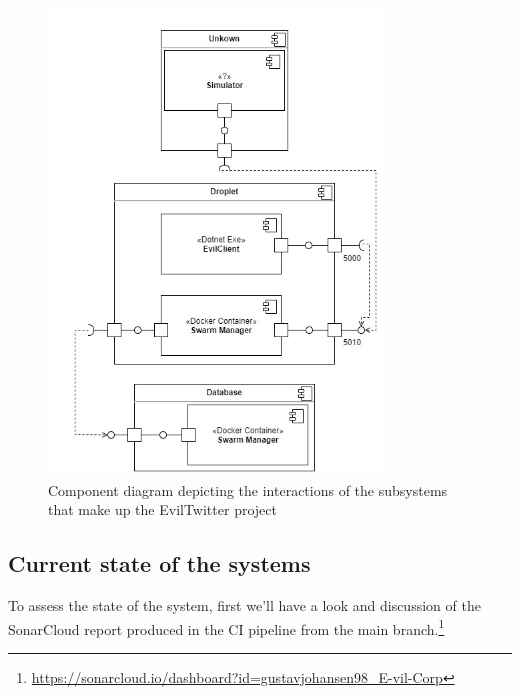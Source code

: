 \documentclass[report/main.tex]{subfiles}
\begin{document}
        \begin{figure}[H]
            \centering
            \includegraphics[width=0.8\textwidth]{report/images/EvilTwitter-Component Diagram - Evil Corp.jpg}
            \caption{Component diagram depicting the interactions of the subsystems that make up the EvilTwitter project}
            \label{fig:component-diagram}
        \end{figure}
        

    
    \subsection{Current state of the systems}
    \label{subsec:current-state-of-the-system}
        To assess the state of the system, first we'll have a look and discussion of the SonarCloud report produced in the CI pipeline from the main branch.\footnote{\hyperlink{https://sonarcloud.io/dashboard?id=gustavjohansen98_E-vil-Corp}{https://sonarcloud.io/dashboard?id=gustavjohansen98\_E-vil-Corp}}
        
\end{document}
